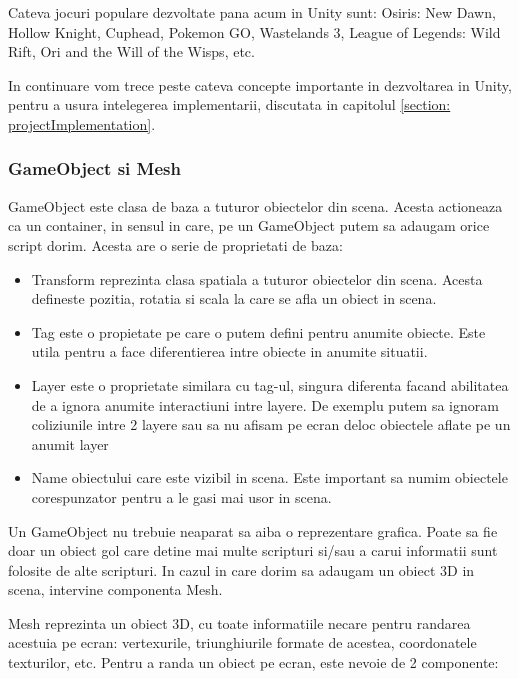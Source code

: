 \documentclass[12pt, a4paper]{article}
\begin{document}
	Cateva jocuri populare dezvoltate pana acum in Unity sunt: Osiris: New Dawn, Hollow Knight, Cuphead, Pokemon GO, Wastelands 3, League of Legends: Wild Rift, Ori and the Will of the Wisps, etc.
	\newline
	
	In continuare vom trece peste cateva concepte importante in dezvoltarea in Unity, pentru a usura intelegerea implementarii, discutata in capitolul \ref{section: projectImplementation}.
	
	
	
	
	\subsubsection{GameObject si Mesh}
	
	GameObject este clasa de baza a tuturor obiectelor din scena. Acesta actioneaza ca un container, in sensul in care, pe un GameObject putem sa adaugam orice script dorim. Acesta are o serie de proprietati de baza:
	
	\begin{itemize}
		\item Transform reprezinta clasa spatiala a tuturor obiectelor din scena. Acesta defineste pozitia, rotatia si scala la care se afla un obiect in scena.
		\item Tag este o propietate pe care o putem defini pentru anumite obiecte. Este utila pentru a face diferentierea intre obiecte in anumite situatii. 
		\item Layer este o proprietate similara cu tag-ul, singura diferenta facand abilitatea de a ignora anumite interactiuni intre layere. De exemplu putem sa ignoram coliziunile intre 2 layere sau sa nu afisam pe ecran deloc obiectele aflate pe un anumit layer
		\item Name obiectului care este vizibil in scena. Este important sa numim obiectele corespunzator pentru a le gasi mai usor in scena.
	\end{itemize}

	Un GameObject nu trebuie neaparat sa aiba o reprezentare grafica. Poate sa fie doar un obiect gol care detine mai multe scripturi si/sau a carui informatii sunt folosite de alte scripturi. In cazul in care dorim sa adaugam un obiect 3D in scena, intervine componenta Mesh.
	\newline
	
	Mesh reprezinta un obiect 3D, cu toate informatiile necare pentru randarea acestuia pe ecran: vertexurile, triunghiurile formate de acestea, coordonatele texturilor, etc. Pentru a randa un obiect pe ecran, este nevoie de 2 componente:
	
\end{document}
